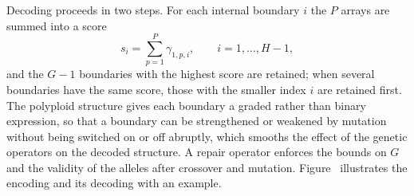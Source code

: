 Decoding proceeds in two steps. For each internal boundary $i$ the $P$ arrays
are summed into a score
%
\begin{equation}
  s_i = \sum_{p=1}^{P} \gamma_{1,p,i}, \qquad i = 1,\dots,H-1,
  \label{eg:eqn:score}
\end{equation}
%
and the $G-1$ boundaries with the highest score are retained; when several boundaries have the same score, those with the smaller index $i$
are retained first. The polyploid structure gives each boundary
a graded rather than binary expression, so that a boundary can be strengthened
or weakened by mutation without being switched on or off abruptly, which
smooths the effect of the genetic operators on the decoded structure. A repair
operator enforces the bounds on $G$ and the validity of the alleles after
crossover and mutation. Figure~ illustrates the
encoding and its decoding with an example.

